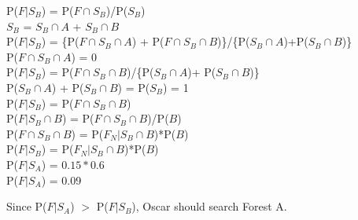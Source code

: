     \begin{center}
        P($F|S_B$) = P($F \cap S_B$)\slash P($S_B$) \\
        $S_B$ = $S_B \cap A$ + $S_B \cap B$ \\
        P($F|S_{B}$) = \{P($F \cap S_{B}\cap A$) + P($F \cap S_{B}\cap B$)\}\slash \{P($S_B \cap A$)+P($S_B \cap B$)\} \\
        P($F \cap S_{B}\cap A$) = 0 \\
        P($F|S_{B}$) = {P($F \cap S_{B}\cap B$)}\slash\{P($S_{B} \cap A$)+ P($S_{B}\cap B$)\} \\
        P($S_B \cap A$) + P($S_B \cap B$) = P($S_B$) = 1 \\
        P($F|S_{B}$) = P($F \cap S_B \cap B$) \\
        P($F|S_B \cap B$) = P($F \cap S_B \cap B$)\slash P($B$) \\
        P($F \cap S_B \cap B$) =  P($F_N|S_B \cap B$)*P($B$) \\ 
        P($F|S_{B}$) = P($F_N|S_B \cap B$)*P($B$) \\
        P($F|S_{A}$) = $0.15*0.6$ \\
        P($F|S_{A}$) = 0.09 \\
    \end{center}
    Since P($F|S_{A}$) $>$ P($F|S_{B}$), Oscar should search Forest A.
\pagebreak